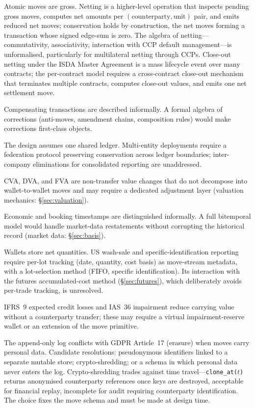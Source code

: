 \documentclass[11pt,a4paper]{article}
\begin{document}
\begin{description}[nosep]
\item[Netting and close-out.] Atomic moves are gross. Netting is a higher-level operation that inspects pending gross moves, computes net amounts per $(\text{counterparty},\text{unit})$ pair, and emits reduced net moves; conservation holds by construction, the net moves forming a transaction whose signed edge-sum is zero. The algebra of netting---commutativity, associativity, interaction with CCP default management---is unformalised, particularly for multilateral netting through CCPs. Close-out netting under the ISDA Master Agreement is a mass lifecycle event over many contracts; the per-contract model requires a cross-contract close-out mechanism that terminates multiple contracts, computes close-out values, and emits one net settlement move.
\item[Correction algebra.] Compensating transactions are described informally. A formal algebra of corrections (anti-moves, amendment chains, composition rules) would make corrections first-class objects.
\item[Multi-entity federation.] The design assumes one shared ledger. Multi-entity deployments require a federation protocol preserving conservation across ledger boundaries; inter-company eliminations for consolidated reporting are unaddressed.
\item[XVA.] CVA, DVA, and FVA are non-transfer value changes that do not decompose into wallet-to-wallet moves and may require a dedicated adjustment layer (valuation mechanics: \S\ref{sec:valuation}).
\item[Bitemporal semantics.] Economic and booking timestamps are distinguished informally. A full bitemporal model would handle market-data restatements without corrupting the historical record (market data: \S\ref{sec:basis}).
\item[Tax-lot tracking.] Wallets store net quantities. US wash-sale and specific-identification reporting require per-lot tracking (date, quantity, cost basis) as move-stream metadata, with a lot-selection method (FIFO, specific identification). Its interaction with the futures accumulated-cost method (\S\ref{sec:futures}), which deliberately avoids per-trade tracking, is unresolved.
\item[Impairment and ECL.] IFRS~9 expected credit losses and IAS~36 impairment reduce carrying value without a counterparty transfer; these may require a virtual impairment-reserve wallet or an extension of the move primitive.
\item[Data privacy and GDPR.] The append-only log conflicts with GDPR Article~17 (erasure) when moves carry personal data. Candidate resolutions: pseudonymous identifiers linked to a separate mutable store; crypto-shredding; or a schema in which personal data never enters the log. Crypto-shredding trades against time travel---\allowbreak\texttt{clone\_at(\allowbreak$t$)} returns anony\-mised counterparty references once keys are destroyed, acceptable for financial replay, incomplete for audit requiring counterparty identification. The choice fixes the move schema and must be made at design time.

\end{description}
\end{document}
